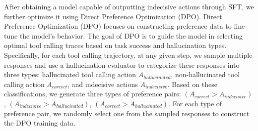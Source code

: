 After obtaining a model capable of outputting indecisive actions through SFT, we further optimize it using Direct Preference Optimization (DPO). Direct Preference Optimization (DPO) focuses on constructing preference data to fine-tune the model’s behavior. The goal of DPO is to guide the model in selecting optimal tool calling traces based on task success and hallucination types. Specifically, for each tool calling trajectory, at any given step, we sample multiple responses and use a hallucination evaluator to categorize these responses into three types: hallucinated tool calling action $A_{hallucinated}$, non-hallucinated tool calling action $A_{coreect}$, and indecisive actions $A_{indecisive}$. Based on these classifications, we generate three types of preference pairs: $(A_{correct}>A_{indecisive})$, $(A_{indecisive}>A_{hallucinated})$, $(A_{correct}>A_{hallucinated})$. For each type of preference pair, we randomly select one from the sampled responses to construct the DPO training data.




